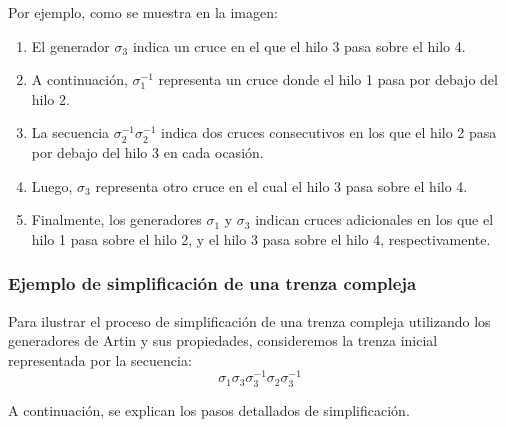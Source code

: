 Por ejemplo, como se muestra en la imagen:

\begin{enumerate}
    \item El generador \(\sigma_3\) indica un cruce en el que el hilo 3 pasa sobre el hilo 4.
    \item A continuación, \(\sigma_1^{-1}\) representa un cruce donde el hilo 1 pasa por debajo del hilo 2.
    \item La secuencia \(\sigma_2^{-1} \sigma_2^{-1}\) indica dos cruces consecutivos en los que el hilo 2 pasa por debajo del hilo 3 en cada ocasión.
    \item Luego, \(\sigma_3\) representa otro cruce en el cual el hilo 3 pasa sobre el hilo 4.
    \item Finalmente, los generadores \(\sigma_1\) y \(\sigma_3\) indican cruces adicionales en los que el hilo 1 pasa sobre el hilo 2, y el hilo 3 pasa sobre el hilo 4, respectivamente.
\end{enumerate}

\subsubsection*{Ejemplo de simplificación de una trenza compleja}

Para ilustrar el proceso de simplificación de una trenza compleja utilizando los generadores de Artin y sus propiedades, consideremos la trenza inicial representada por la secuencia:
\[
    \sigma_1 \sigma_3 \sigma_3^{-1} \sigma_2 \sigma_3^{-1}
\]

A continuación, se explican los pasos detallados de simplificación.

